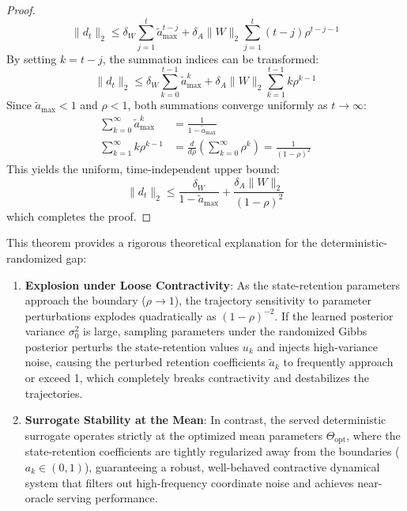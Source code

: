 \begin{proof}
\begin{equation}
    \|d_t\|_2 \le \delta_W \sum_{j=1}^t \tilde{a}_{\max}^{t-j} + \delta_A \|W\|_2 \sum_{j=1}^t (t-j) \rho^{t-j-1}
\end{equation}
By setting $k = t-j$, the summation indices can be transformed:
\begin{equation}
    \|d_t\|_2 \le \delta_W \sum_{k=0}^{t-1} \tilde{a}_{\max}^{k} + \delta_A \|W\|_2 \sum_{k=1}^{t-1} k \rho^{k-1}
\end{equation}
Since $\tilde{a}_{\max} < 1$ and $\rho < 1$, both summations converge uniformly as $t \to \infty$:
\begin{align}
    \sum_{k=0}^{\infty} \tilde{a}_{\max}^{k} &= \frac{1}{1 - \tilde{a}_{\max}} \\
    \sum_{k=1}^{\infty} k \rho^{k-1} &= \frac{d}{d\rho} \left( \sum_{k=0}^{\infty} \rho^k \right) = \frac{1}{(1 - \rho)^2}
\end{align}
This yields the uniform, time-independent upper bound:
\begin{equation}
    \|d_t\|_2 \le \frac{\delta_W}{1 - \tilde{a}_{\max}} + \frac{\delta_A \|W\|_2}{(1 - \rho)^2}
\end{equation}
which completes the proof.
\end{proof}

This theorem provides a rigorous theoretical explanation for the deterministic-randomized gap:
\begin{enumerate}
    \item \textbf{Explosion under Loose Contractivity}: As the state-retention parameters approach the boundary ($\rho \to 1$), the trajectory sensitivity to parameter perturbations explodes quadratically as $(1 - \rho)^{-2}$. If the learned posterior variance $\sigma_0^2$ is large, sampling parameters under the randomized Gibbs posterior perturbs the state-retention values $u_k$ and injects high-variance noise, causing the perturbed retention coefficients $\tilde{a}_k$ to frequently approach or exceed 1, which completely breaks contractivity and destabilizes the trajectories.
    \item \textbf{Surrogate Stability at the Mean}: In contrast, the served deterministic surrogate operates strictly at the optimized mean parameters $\Theta_{\text{opt}}$, where the state-retention coefficients are tightly regularized away from the boundaries ($a_k \in (0, 1)$), guaranteeing a robust, well-behaved contractive dynamical system that filters out high-frequency coordinate noise and achieves near-oracle serving performance.
\end{enumerate}

